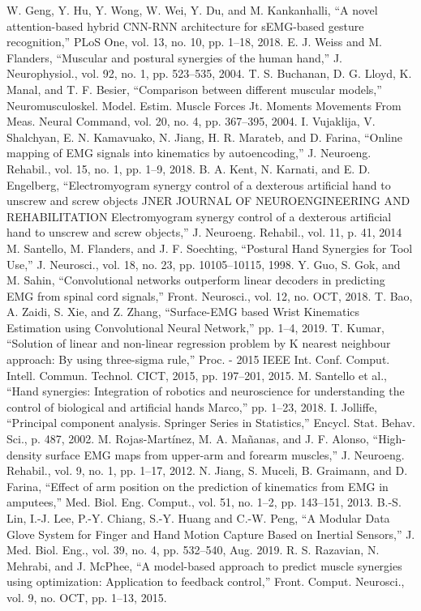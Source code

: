\documentclass[conference]{IEEEtran}
\begin{document}
\begin{thebibliography}{00}
 W. Geng, Y. Hu, Y. Wong, W. Wei, Y. Du, and M. Kankanhalli, “A novel attention-based hybrid CNN-RNN architecture for sEMG-based gesture recognition,” PLoS One, vol. 13, no. 10, pp. 1–18, 2018.
 E. J. Weiss and M. Flanders, “Muscular and postural synergies of the human hand,” J. Neurophysiol., vol. 92, no. 1, pp. 523–535, 2004.
 T. S. Buchanan, D. G. Lloyd, K. Manal, and T. F. Besier, “Comparison between different muscular 
models,” Neuromusculoskel. Model. Estim. Muscle Forces Jt. Moments Movements From Meas. 
Neural Command, vol. 20, no. 4, pp. 367–395, 2004.
 I. Vujaklija, V. Shalchyan, E. N. Kamavuako, N. Jiang, H. R. Marateb, and D. Farina, “Online 
mapping of EMG signals into kinematics by autoencoding,” J. Neuroeng. Rehabil., vol. 15, no. 1, pp. 
1–9, 2018.
 B. A. Kent, N. Karnati, and E. D. Engelberg, “Electromyogram synergy control of a dexterous 
artificial hand to unscrew and screw objects JNER JOURNAL OF NEUROENGINEERING AND 
REHABILITATION Electromyogram synergy control of a dexterous artificial hand to unscrew and
screw objects,” J. Neuroeng. Rehabil., vol. 11, p. 41, 2014
 M. Santello, M. Flanders, and J. F. Soechting, “Postural Hand Synergies for Tool Use,” J. Neurosci., 
vol. 18, no. 23, pp. 10105–10115, 1998.
 Y. Guo, S. Gok, and M. Sahin, “Convolutional networks outperform linear decoders in predicting 
EMG from spinal cord signals,” Front. Neurosci., vol. 12, no. OCT, 2018.
 T. Bao, A. Zaidi, S. Xie, and Z. Zhang, “Surface-EMG based Wrist Kinematics Estimation using 
Convolutional Neural Network,” pp. 1–4, 2019.
 T. Kumar, “Solution of linear and non-linear regression problem by K nearest neighbour approach: 
By using three-sigma rule,” Proc. - 2015 IEEE Int. Conf. Comput. Intell. Commun. Technol. CICT,
2015, pp. 197–201, 2015.
 M. Santello et al., “Hand synergies: Integration of robotics and neuroscience for understanding the 
control of biological and artificial hands Marco,” pp. 1–23, 2018.
 I. Jolliffe, “Principal component analysis. Springer Series in Statistics,” Encycl. Stat. Behav. Sci., p. 
487, 2002.
 M. Rojas-Martínez, M. A. Mañanas, and J. F. Alonso, “High-density surface EMG maps from upper-arm and forearm muscles,” J. Neuroeng. Rehabil., vol. 9, no. 1, pp. 1–17, 2012.
 N. Jiang, S. Muceli, B. Graimann, and D. Farina, “Effect of arm position on the prediction of 
kinematics from EMG in amputees,” Med. Biol. Eng. Comput., vol. 51, no. 1–2, pp. 143–151, 2013.
 B.-S. Lin, I.-J. Lee, P.-Y. Chiang, S.-Y. Huang and C.-W. Peng, “A Modular Data Glove System for 
Finger and Hand Motion Capture Based on Inertial Sensors,” J. Med. Biol. Eng., vol. 39, no. 4, pp. 
532–540, Aug. 2019.
 R. S. Razavian, N. Mehrabi, and J. McPhee, “A model-based approach to predict muscle synergies 
using optimization: Application to feedback control,” Front. Comput. Neurosci., vol. 9, no. OCT, pp. 
1–13, 2015.
\end{thebibliography}
\end{document}
